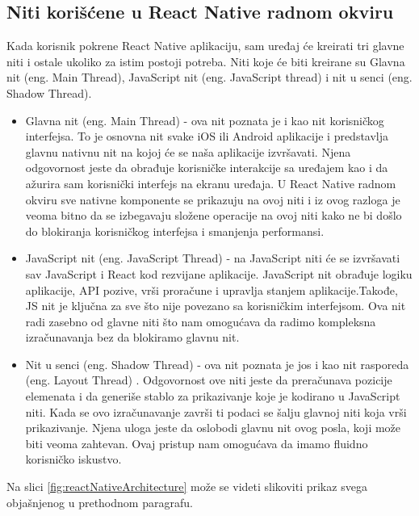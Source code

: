 \documentclass[12pt,oneside]{memoir}
\begin{document}
\subsection{Niti korišćene u React Native radnom okviru}

Kada korisnik pokrene React Native aplikaciju, sam uređaj će kreirati tri glavne niti\cite{threads} i ostale ukoliko za istim postoji potreba. Niti koje će biti kreirane su Glavna nit (eng. Main Thread), JavaScript nit (eng. JavaScript thread) i nit u senci (eng. Shadow Thread).

\begin{itemize}
    \item Glavna nit\cite{RNArch} (eng. Main Thread) - ova nit poznata je i kao nit korisničkog interfejsa. To je osnovna nit svake iOS ili Android aplikacije i predstavlja glavnu nativnu nit na kojoj će se naša aplikacije izvršavati. Njena odgovornost jeste da obrađuje korisničke interakcije sa uređajem kao i da ažurira sam korisnički interfejs na ekranu uređaja. U React Native radnom okviru sve nativne komponente se prikazuju na ovoj niti i iz ovog razloga je veoma bitno da se izbegavaju složene operacije na ovoj niti kako ne bi došlo do blokiranja korisničkog interfejsa i smanjenja performansi.
    \item JavaScript nit (eng. JavaScript Thread) - na JavaScript niti će se izvršavati sav JavaScript i React kod rezvijane aplikacije. JavaScript nit obrađuje logiku aplikacije, API pozive, vrši proračune i upravlja stanjem aplikacije.Takođe, JS nit je ključna za sve što nije povezano sa korisničkim interfejsom. Ova nit radi zasebno od glavne niti što nam omogućava da radimo kompleksna izračunavanja bez da blokiramo glavnu nit. 
    \item Nit u senci (eng. Shadow Thread) - ova nit poznata je jos i kao nit rasporeda (eng. Layout Thread) . Odgovornost ove niti jeste da preračunava pozicije elemenata i da generiše stablo za prikazivanje koje je kodirano u JavaScript niti. Kada se ovo izračunavanje završi ti podaci se šalju glavnoj niti koja vrši prikazivanje. Njena uloga jeste da oslobodi glavnu nit ovog posla, koji može biti veoma zahtevan. Ovaj pristup nam omogućava da imamo fluidno korisničko iskustvo.
\end{itemize}

Na slici \ref{fig:reactNativeArchitecture} može se videti slikoviti prikaz svega objašnjenog u prethodnom paragrafu.
\end{document}
